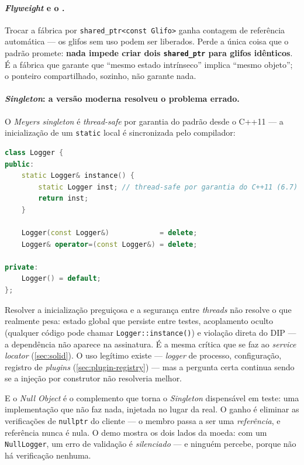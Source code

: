 \paragraph{\emph{Flyweight} e o .} Trocar a fábrica por
\texttt{shared\_ptr<const Glifo>} ganha contagem de referência automática --- os
glifos sem uso podem ser liberados. Perde a única coisa que o padrão promete:
\textbf{nada impede criar dois \texttt{shared\_ptr} para glifos idênticos}. É a
fábrica que garante que ``mesmo estado intrínseco'' implica ``mesmo objeto''; o
ponteiro compartilhado, sozinho, não garante nada.

\paragraph{\emph{Singleton}: a versão moderna resolveu o problema errado.} O
\emph{Meyers singleton} é \emph{thread-safe} por garantia do padrão desde o
C++11 --- a inicialização de um \texttt{static} local é sincronizada pelo
compilador:

\begin{lstlisting}[style=bt, language=C++,
    caption={O \emph{Meyers singleton}: \emph{thread-safe} por garantia do padrão.}]
class Logger {
public:
    static Logger& instance() {
        static Logger inst; // thread-safe por garantia do C++11 (6.7)
        return inst;
    }

    Logger(const Logger&)            = delete;
    Logger& operator=(const Logger&) = delete;

private:
    Logger() = default;
};
\end{lstlisting}

\begin{armadilha}
Resolver a inicialização preguiçosa e a segurança entre \emph{threads} não
resolve o que realmente pesa: estado global que persiste entre testes,
acoplamento oculto (qualquer código pode chamar \texttt{Logger::instance()}) e
violação direta do DIP --- a dependência não aparece na assinatura. É a mesma
crítica que se faz ao \emph{service locator} (\cref{sec:solid}). O uso legítimo
existe --- \emph{logger} de processo, configuração, registro de \emph{plugins}
(\cref{sec:plugin-registry}) --- mas a pergunta certa continua sendo se a
injeção por construtor não resolveria melhor.
\end{armadilha}

E o \emph{Null Object} é o complemento que torna o \emph{Singleton} dispensável
em teste: uma implementação que não faz nada, injetada no lugar da real. O ganho
é eliminar as verificações de \texttt{nullptr} do cliente --- o membro passa a
ser uma \emph{referência}, e referência nunca é nula. O demo mostra os dois
lados da moeda: com um \texttt{NullLogger}, um erro de validação é
\emph{silenciado} --- e ninguém percebe, porque não há verificação nenhuma.

